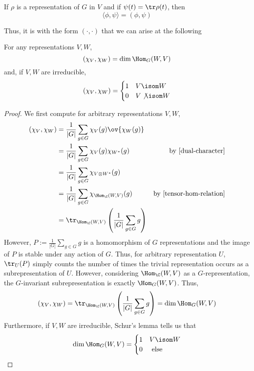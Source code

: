 \documentclass[11pt,leqno,oneside]{amsbook}
\numberwithin{thm}{section}
\begin{document}
\begin{prop}
  If \(\rho\) is a representation of \(G\) in \(V\) and if \(\psi(t) =
  \tr \rho(t)\), then \[
    \langle \phi, \psi \rangle = (\phi, \psi)
  \]
\end{prop}
Thus, it is with the form \((\cdot, \cdot)\) that we can arise at the
following
\begin{thm}\label{orthonormal}
  For any representations \(V,W\), \[
    (\chi_V, \chi_W) = \dim \Hom_G(W,V) 
  \]
  and, if \(V,W\) are irreducible, \[
    (\chi_V, \chi_W) =
    \begin{cases}
      1 & V \isom W \\
      0 & V \not \isom W
    \end{cases}
  \]
\end{thm}
\begin{proof}
  We first compute for arbitrary representations \(V,W\),
  \begin{align*}
    (\chi_V, \chi_W) & = \frac{1}{|G|} \sum_{g \in G} \chi_V(g)
                       \ov{\chi_W(g)} \\
                     & = \frac{1}{|G|} \sum_{g \in G} \chi_V(g)
                       \chi_{W^*}(g) & \text{by \ref{dual-character}}\\
                     & = \frac{1}{|G|} \sum_{g \in G} \chi_{V \otimes
                       W^*}(g) \\
                     & = \frac{1}{|G|} \sum_{g \in G}
                       \chi_{\Hom_\C(W,V)}(g) & \text{by \ref{tensor-hom-relation}}\\
                     & = \tr_{\Hom_\C(W,V)}\left(\frac{1}{|G|}\sum_{g \in G} g\right)
  \end{align*}
  However, \(P := \frac{1}{|G|} \sum_{g \in G} g\) is a homomorphism of
  \(G\) representations and the image of \(P\) is
  stable under any action of \(G\). Thus, for arbitrary representation
  \(U\), \(\tr_U(P)\) simply counts
  the number of times the trivial representation occurs as a
  subrepresentation of \(U\). However, considering \(\Hom_\C(W,V)\) as
  a \(G\)-representation, the \(G\)-invariant subrepresentation is
  exactly \(\Hom_G(W,V)\). Thus, \[
   (\chi_V, \chi_W) = \tr_{\Hom_\C(W,V)}\left(\frac{1}{|G|}\sum_{g \in G} g\right) = \dim \Hom_G(W,V)
  \]
  Furthermore, if \(V,W\) are irreducible, Schur's lemma tells us
  that \[
    \dim \Hom_G(W,V) =
    \begin{cases}
      1 & V \isom W \\
      0 & \text{ else }
    \end{cases}
  \]
\end{proof}
\end{document}
